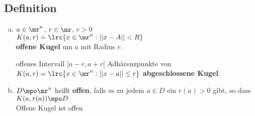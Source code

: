 \subsection{Definition}
	\begin{enumerate}[a)]
		\item $ a\in\mr^n $, $ r\in\mr $, $ r>0 $\\
		$ K(a,r)=\lrc{x\in\mr^n:||x-A||<R} $\\
		\textbf{offene Kugel} um $ a $ mit Radius $ r $.
		
		
		offenes Intervall $ ]a-r,a+r[ $
		Adhärenzpunkte von $ K(a,r)=\lrc{x\in\mr^n:||x-a||\leq r} $ \textbf{abgeschlossene Kugel}.
		
		\item  $ D\mpo\mr^n $ heißt \textbf{offen}, falls es zu jedem $ a\in D $ ein $ r(a)>0 $ gibt, so dass $ K(a,r(a))\mpo D $\\
		Offene Kugel ist offen
	\end{enumerate}

